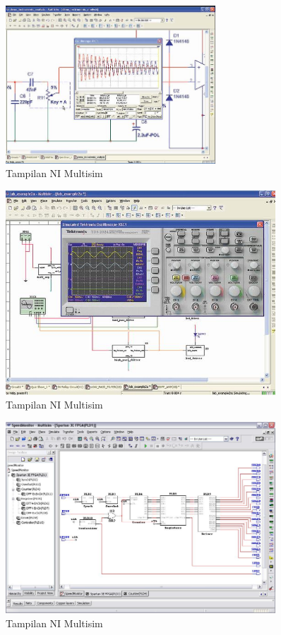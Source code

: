 \begin{enumerate}
      \begin{figure}[H]
    \centering
    \includegraphics[width=0.7\textwidth]{figures/ni1.png}
    \caption{Tampilan NI Multisim }
    \label{print}
    \end{figure}
    
    
      \begin{figure}[H]
    \centering
    \includegraphics[width=0.9\textwidth]{figures/ni2.png}
    \caption{Tampilan NI Multisim  }
    \label{print}
    \end{figure}
    
      \begin{figure}[H]
    \centering
    \includegraphics[width=0.9\textwidth]{figures/ni3.png}
    \caption{Tampilan NI Multisim  }
    \label{print}
    \end{figure}


\end{enumerate}
